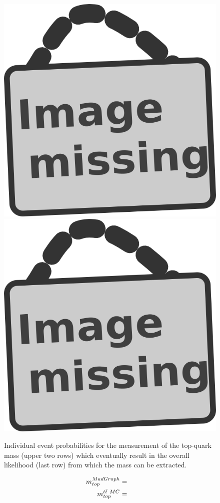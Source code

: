 \begin{figure}[h!tb]
 \includegraphics[width = 0.31 \textwidth]{image.png} \hspace{0.1cm} \\
 \includegraphics[width = 0.4 \textwidth]{image.png}
 \caption{Individual event probabilities for the measurement of the top-quark mass (upper two rows) which eventually result in the overall likelihood (last row) from which the mass can be extracted.} \label{fig::EvtProbsMT}
\end{figure}

\begin{eqnarray}
 m_{top}^{MadGraph} & = &  \\
 m_{top}^{t\bar{t} ~ MC} & = & 
\end{eqnarray}



